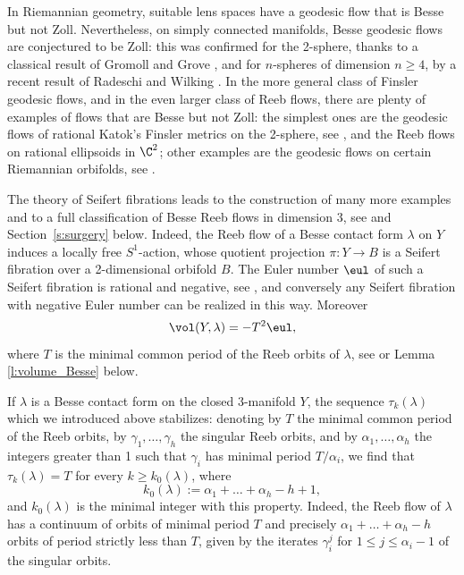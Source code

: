 In Riemannian geometry, suitable lens spaces have a geodesic flow that is Besse but not Zoll. Nevertheless, on simply connected manifolds, Besse geodesic flows are conjectured to be Zoll: this was confirmed for the 2-sphere, thanks to a classical result of Gromoll and Grove \cite{Gromoll:1981kl}, and for $n$-spheres of dimension $n\geq 4$, by a recent result of Radeschi and Wilking \cite{Radeschi:2017dz}. In the more general class of Finsler geodesic flows, and in the even larger class of Reeb flows, there are plenty of examples of flows that are Besse but not Zoll: the simplest ones are the geodesic flows of rational Katok's Finsler metrics on the 2-sphere, see \cite{Katok:1973mw,Ziller:1983rw}, and the Reeb flows on rational ellipsoids in $\C^2$; other examples are the geodesic flows on certain Riemannian orbifolds, see \cite{Besse:1978pr,Lange:2020,Lange:2021}.

The theory of Seifert fibrations leads to the construction of many more examples and to a full classification of Besse Reeb flows in dimension $3$, see \cite{Kegel:2021vo} and Section~\ref{s:surgery} below. Indeed, the Reeb flow of a Besse contact form $\lambda$ on $Y$ induces a locally free $S^1$-action, whose quotient projection $\pi: Y \to B$ is a Seifert fibration over a 2-dimensional orbifold $B$. The Euler number $\eul$ of such a Seifert fibration is rational and negative, see \cite{Lisca:2004oz}, and conversely any Seifert fibration with negative Euler number can be realized in this way. Moreover
\begin{equation}
\label{volumeBesse}
\vol(Y,\lambda) = -T^2 \eul,
\end{equation}
where $T$ is the minimal common period of the Reeb orbits of $\lambda$, see \cite[Cor.\,6.3]{Geiges:2020aa} or Lemma \ref{l:volume_Besse} below.

If $\lambda$ is a Besse contact form on the closed $3$-manifold $Y$, the sequence $\tau_k(\lambda)$ which we introduced above stabilizes: denoting by $T$ the minimal common period of the Reeb orbits, by $\gamma_1,\dots,\gamma_h$ the singular Reeb orbits, and by $\alpha_1,\dots,\alpha_h$ the integers greater than 1 such that $\gamma_i$ has minimal period $T/\alpha_i$, we find that $\tau_k(\lambda)=T$ for every $k\geq k_0(\lambda)$, where
\[
k_0(\lambda):= \alpha_1+\dots+\alpha_h - h + 1,
\]
and $k_0(\lambda)$ is the minimal integer with this property. Indeed, the Reeb flow of $\lambda$ has a continuum of orbits of minimal period $T$ and precisely $\alpha_1+\dots+\alpha_h - h$ orbits of period strictly less than $T$, given by the iterates $\gamma_i^j$ for $1\leq j \leq \alpha_i - 1$ of the singular orbits.

